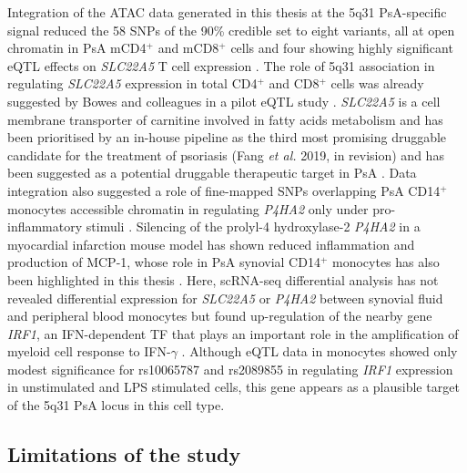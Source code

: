 Integration of the ATAC data generated in this thesis at the 5q31 PsA-specific signal reduced the 58 SNPs of the 90\% credible set to eight variants, all at open chromatin in PsA mCD4$^+$ and mCD8$^+$ cells and four showing highly significant eQTL effects on \textit{SLC22A5} T cell expression \parencite{Kasela2017}. The role of 5q31 association in regulating \textit{SLC22A5} expression in total CD4$^+$ and CD8$^+$ cells was already suggested by Bowes and colleagues in a pilot eQTL study \parencite{Bowes2015}. \textit{SLC22A5} is a cell membrane transporter of carnitine involved in fatty acids metabolism and has been prioritised by an in-house pipeline as the third most promising druggable candidate for the treatment of psoriasis (Fang \textit{et al.} 2019, in revision) and has been suggested as a potential druggable therapeutic target in PsA \parencite{Leung2006}. Data integration also suggested a role of fine-mapped SNPs overlapping PsA CD14$^+$ monocytes accessible chromatin in regulating \textit{P4HA2} only under pro-inflammatory stimuli \parencite{Fairfax2014}. Silencing of the prolyl-4 hydroxylase-2 \textit{P4HA2} in a myocardial infarction mouse model has shown reduced inflammation and production of MCP-1, whose role in PsA synovial CD14$^+$ monocytes has also been highlighted in this thesis \parencite{Natarajan2007}. Here, scRNA-seq differential analysis has not revealed differential expression for \textit{SLC22A5} or \textit{P4HA2} between synovial fluid and peripheral blood monocytes but found up-regulation of the nearby gene \textit{IRF1}, an IFN-dependent TF that plays an important role in the amplification of myeloid cell response to IFN-$\gamma$ \parencite{Hu2009}. Although eQTL data in monocytes showed only modest significance for rs10065787 and rs2089855 in regulating \textit{IRF1} expression in unstimulated and LPS stimulated cells, this gene appears as a plausible target of the 5q31 PsA locus in this cell type.




\subsection{Limitations of the study}
\label{Discussion_scRNAseq}

